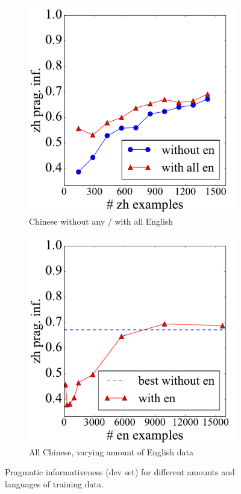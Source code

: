 \documentclass[11pt,a4paper]{article}
\renewcommand{\|}{\mid}
\begin{document}
\begin{figure}[t]
    \begin{subfigure}[b]{0.465\columnwidth}
    \centering
    \includegraphics[width=\textwidth]{lowdata_aen2zh_4way.pdf}
    \caption{Chinese without any / with all English}
    \label{fig:lowdata-aen2zh}
    \end{subfigure}
    \hspace{0.04\columnwidth}
    \begin{subfigure}[b]{0.465\columnwidth}
    \centering
    \includegraphics[width=\textwidth]{lowdata_en2azh_4way.pdf}
    \caption{All Chinese, varying amount of English data}
    \label{fig:lowdata-en2azh}
    \end{subfigure}
%
\caption{Pragmatic informativeness (dev set) for different amounts and languages of training data.}
\label{fig:lowdata}
\end{figure}
\end{document}
